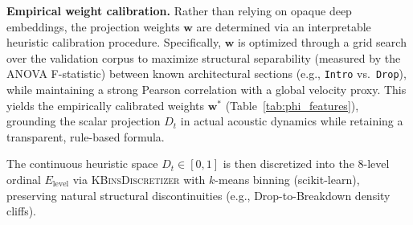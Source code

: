 \documentclass[pdflatex,sn-mathphys-num,twocolumn]{sn-jnl}
\theoremstyle{thmstyleone}
\theoremstyle{thmstyletwo}
\begin{document}
\begin{tableorg}[ht]
\centering\small
\caption{Feature vector $\boldsymbol{\phi}_t$ in Eq.~\eqref{eq:energy} and the empirically calibrated weights $\boldsymbol{w}^*$.}
\label{tab:phi_features}
\end{tableorg}

\textbf{Empirical weight calibration.} Rather than relying on opaque deep embeddings, the projection weights $\boldsymbol{w}$ are determined via an interpretable heuristic calibration procedure. Specifically, $\boldsymbol{w}$ is optimized through a grid search over the validation corpus to maximize structural separability (measured by the ANOVA F-statistic) between known architectural sections (e.g., \texttt{Intro} vs.\ \texttt{Drop}), while maintaining a strong Pearson correlation with a global velocity proxy. This yields the empirically calibrated weights $\boldsymbol{w}^*$ (Table~\ref{tab:phi_features}), grounding the scalar projection $D_t$ in actual acoustic dynamics while retaining a transparent, rule-based formula.

The continuous heuristic space $D_t\in[0,1]$ is then discretized into the 8-level ordinal
$E_{\mathrm{level}}$ via \textsc{KBinsDiscretizer} with $k$-means binning (scikit-learn),
preserving natural structural discontinuities (e.g., Drop-to-Breakdown density cliffs).
\end{document}
